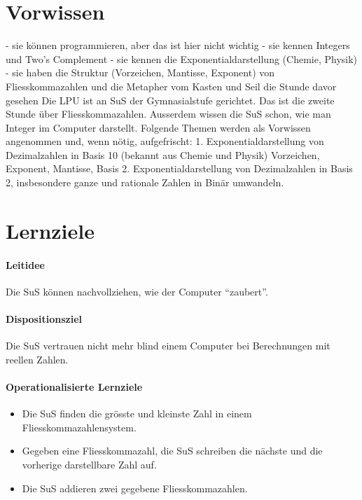 \documentclass{article}
\begin{document}
\section*{Vorwissen}
       - sie können programmieren, aber das ist hier nicht wichtig
       - sie kennen Integers und Two’s Complement
       - sie kennen die Exponentialdarstellung (Chemie, Physik)
       - sie haben die Struktur (Vorzeichen, Mantisse, Exponent) von Fliesskommazahlen und die Metapher vom Kasten und Seil die Stunde davor gesehen
       Die LPU ist an SuS der Gymnasialstufe gerichtet. Das ist die zweite Stunde über Fliesskommazahlen. Ausserdem wissen die SuS schon, wie man Integer im Computer darstellt.
       Folgende Themen werden als Vorwissen angenommen und, wenn nötig, aufgefrischt:
       1. Exponentialdarstellung von Dezimalzahlen in Basis 10 (bekannt aus Chemie und Physik) Vorzeichen, Exponent, Mantisse, Basis
       2. Exponentialdarstellung von Dezimalzahlen in Basis 2, insbesondere ganze und rationale Zahlen in Binär umwandeln.

\section*{Lernziele}

\paragraph{Leitidee} Die SuS können nachvollziehen, wie der Computer “zaubert”.

\paragraph{Dispositionsziel} Die SuS vertrauen nicht mehr blind einem Computer bei Berechnungen mit reellen Zahlen.

\paragraph{Operationalisierte Lernziele}
\begin{itemize}
\item Die SuS finden die grösste und kleinste Zahl in einem Fliesskommazahlensystem.
\item Gegeben eine Fliesskommazahl, die SuS schreiben die nächste und die vorherige darstellbare Zahl auf.
\item Die SuS addieren zwei gegebene Fliesskommazahlen.
\end{itemize}
\end{document}

